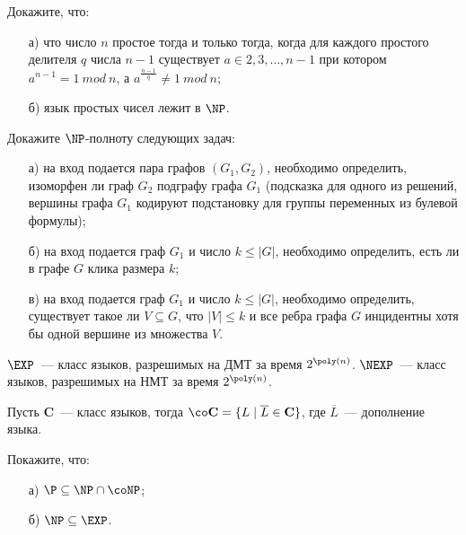 
\begin{task}
    Докажите, что:
   	\begin{enumerate}[topsep = 0pt, itemsep = -1ex]
        \item [а)] что число $n$ простое тогда и только тогда, когда для каждого простого делителя $q$ числа $n - 1$ существует $a
            \in {2, 3, \dots, n - 1}$ при котором $a^{n - 1} = 1~mod~n$, а $a^{\frac{n - 1}{q}} \ne 1~mod~n$;
        \item [б)] язык простых чисел лежит в $\NP$.
	\end{enumerate}
\end{task}


\begin{task}
    Докажите $\NP$-полноту следующих задач:
    \begin{enumerate}[topsep = 0pt, itemsep = -1ex]
        \item [а)] на вход подается пара графов $(G_1, G_2)$, необходимо определить, изоморфен ли граф $G_2$ подграфу графа $G_1$
            (подсказка для одного из решений, вершины графа $G_1$ кодируют подстановку для группы переменных из булевой формулы);
        \item [б)] на вход подается граф $G_1$ и число $k \le |G|$, необходимо определить, есть ли в графе $G$ клика размера $k$;
        \item [в)] на вход подается граф $G_1$ и число $k \le |G|$, необходимо определить, существует такое ли $V \subseteq G$,
            что $|V| \le k$ и все ребра графа $G$ инцидентны хотя бы одной вершине из множества $V$.
	\end{enumerate}
\end{task}

\vspace{0.5cm}

$\EXP$~--- класс языков, разрешимых на ДМТ за время $2^{\poly(n)}$. $\NEXP$~--- класс языков, разрешимых на НМТ за время
$2^{\poly(n)}$.

Пусть $\mathbf{C}$~--- класс языков, тогда ${\co}\mathbf{C} = \{L \mid \overline{L} \in \mathbf{C}\}$, где $\overline{L}$~---
дополнение языка.

\begin{task}
    Покажите, что:
    \begin{enumerate}[topsep = 0pt, itemsep = -1ex]
        \item [а)] $\P \subseteq \NP \cap \coNP$;
        \item [б)] $\NP \subseteq \EXP$.
	\end{enumerate}
\end{task}

